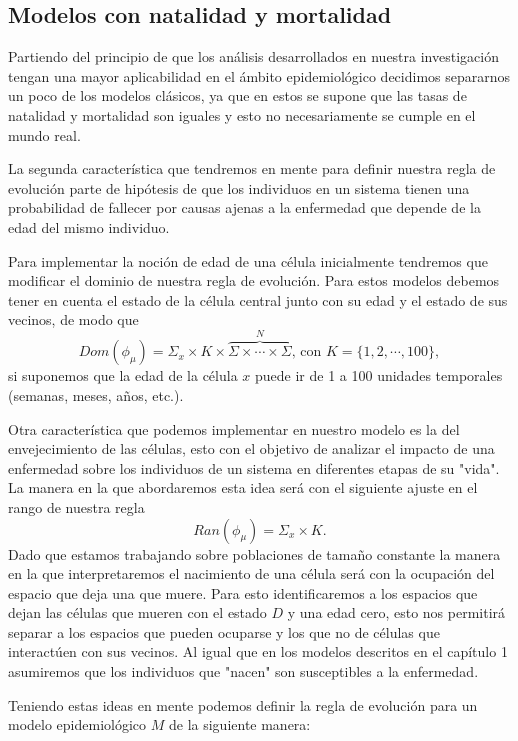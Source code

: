 \begin{example}

\end{example}

\subsection{Modelos con natalidad y mortalidad}\label{sub:NatalidadyMortalidad}
Partiendo del principio de que los análisis desarrollados en nuestra investigación tengan una mayor aplicabilidad en el ámbito epidemiológico decidimos separarnos un poco de los modelos clásicos, ya que en estos se supone que las tasas de natalidad y mortalidad son iguales y esto no necesariamente se cumple en el mundo real.

La segunda característica que tendremos en mente para definir nuestra regla de evolución parte de hipótesis de que los individuos en un sistema tienen una probabilidad de fallecer por causas ajenas a la enfermedad que depende de la edad del mismo individuo.

Para implementar la noción de edad de una célula inicialmente tendremos que modificar el dominio de nuestra regla de evolución. Para estos modelos debemos tener en cuenta el estado de la célula central junto con su edad y el estado de sus vecinos, de modo que 
$$Dom(\phi_\mu)=\Sigma_x\times K\times\overbrace{\Sigma\times\cdots\times\Sigma}^N\text{, con }K=\{1,2,\cdots,100\},$$
si suponemos que la edad de la célula $x$ puede ir de 1 a 100 unidades temporales (semanas, meses, años, etc.).

Otra característica que podemos implementar en nuestro modelo es la del envejecimiento de las células, esto con el objetivo de analizar el impacto de una enfermedad sobre los individuos de un sistema en diferentes etapas de su "vida". La manera en la que abordaremos esta idea será con el siguiente ajuste en el rango de nuestra regla
$$Ran(\phi_\mu)=\Sigma_x\times K.$$
Dado que estamos trabajando sobre poblaciones de tamaño constante la manera en la que interpretaremos el nacimiento de una célula será con la ocupación del espacio que deja una que muere. Para esto identificaremos a los espacios que dejan las células que mueren con el estado $D$ y una edad cero, esto nos permitirá separar a los espacios que pueden ocuparse y los que no de células que interactúen con sus vecinos. Al igual que en los modelos descritos en el capítulo 1 asumiremos que los individuos que "nacen" son susceptibles a la enfermedad.

Teniendo estas ideas en mente podemos definir la regla de evolución para un modelo epidemiológico $M$ de la siguiente manera:

